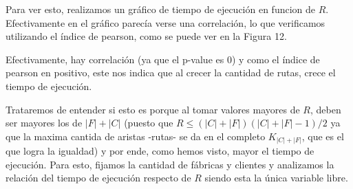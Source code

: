 \documentclass[A4paper,oneside,fleqn,11pt]{article}
\theoremstyle{definition}
\begin{document}
 Para ver esto, realizamos un gráfico de tiempo de ejecución en funcion de $R$. Efectivamente en el gráfico parecía verse una correlación, lo que verificamos utilizando el índice de pearson, como se puede ver en la Figura 12.


Efectivamente, hay correlación (ya que el p-value es 0) y como el índice de pearson en positivo, este nos indica que al crecer la cantidad de rutas, crece el tiempo de ejecución. 

Trataremos de entender si esto es porque al tomar valores mayores de $R$, deben ser mayores los de $|F|+|C|$ (puesto que $R \leq (|C|+|F|)(|C|+|F|-1)/2$ ya que la maxima cantida de aristas -rutas- se da en el completo $K_{|C|+|F|}$, que es el que logra la igualdad) y por ende, como hemos visto, mayor el tiempo de ejecución. Para esto, fijamos la cantidad de fábricas y clientes y analizamos la relación del tiempo de ejecución respecto de $R$ siendo esta la única variable libre.
\end{document}
